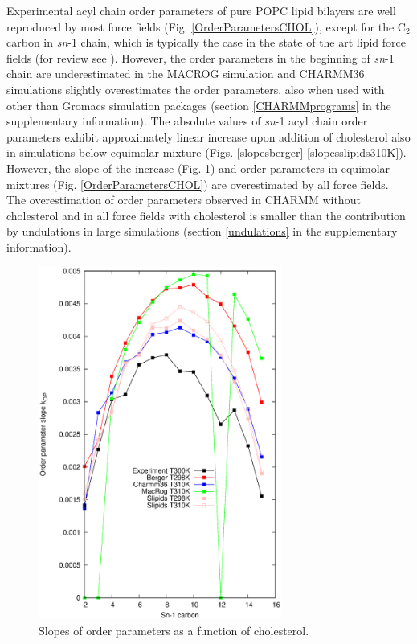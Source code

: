 \documentclass[aps,prl,superscriptaddress,twocolumn]{revtex4}
\begin{document}
Experimental acyl chain order parameters of pure POPC lipid bilayers
are well reproduced by most force fields (Fig. \ref{OrderParametersCHOL}),
except for the C$_2$ carbon in {\it sn}-1 chain,
which is typically the case in the state of the art lipid force fields (for review see \cite{ollila16}).
However, the order parameters in the beginning of {\it sn}-1 chain are underestimated in the
MACROG simulation and CHARMM36 simulations slightly overestimates the order parameters, also when
used with other than Gromacs simulation packages (section \ref{CHARMMprograms} in the supplementary information).
The absolute values of {\it sn}-1 acyl chain order parameters exhibit approximately linear increase upon addition
of cholesterol also in simulations below equimolar mixture (Figs. \ref{slopesberger}-\ref{slopesslipids310K}).
However, the slope of the increase (Fig. \ref{OrderParametersCHOLchanges}) and order parameters
in equimolar mixtures (Fig. \ref{OrderParametersCHOL}) are overestimated by all force fields.
The overestimation of order parameters observed in CHARMM without cholesterol and in all force fields
with cholesterol is smaller than the contribution by undulations in large simulations (section \ref{undulations} in the supplementary information).
\begin{figure}[]
  \centering
  \includegraphics[width=8cm]{../FIGS/slopes.eps}
  \caption{\label{OrderParametersCHOLchanges}
    Slopes of order parameters as a function of cholesterol.
  }
\end{figure}
\end{document}
